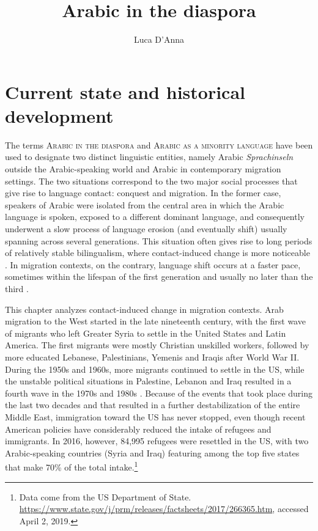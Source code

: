 \documentclass[output=paper]{langsci/langscibook}
\author{Luca D'Anna\affiliation{Università degli Studi di Napoli `L'Orientale'}}
\title{Arabic in the diaspora}
\begin{document}
\maketitle 

\section{Current state and historical development}

The terms \textsc{Arabic in the diaspora} and \textsc{Arabic as a minority language} have been used to designate two distinct linguistic entities, namely Arabic \textit{Sprachinseln} outside the Arabic-speaking world and Arabic in contemporary migration settings. The two situations correspond to the two major social processes that give rise to language contact: conquest and migration. In the former case, speakers of Arabic were isolated from the central area in which the Arabic language is spoken, exposed to a different dominant language, and consequently underwent a slow process of language erosion (and eventually shift) usually spanning across several generations. This situation often gives rise to long periods of relatively stable bilingualism, where contact-induced change is more noticeable \citep[641]{Sankoff2001}. In migration contexts, on the contrary, language shift occurs at a faster pace, sometimes within the lifespan of the first generation and usually no later than the third \citep[151]{Canagarajah2008}. 

This chapter analyzes contact-induced change in migration contexts. Arab migration to the West started in the late nineteenth century, with the first wave of migrants who left Greater Syria to settle in the United States and Latin America. The first migrants were mostly Christian unskilled workers, followed by more educated Lebanese, Palestinians, Yemenis and Iraqis after World War II. During the 1950s and 1960s, more migrants continued to settle in the US, while the unstable political situations in Palestine, Lebanon and Iraq resulted in a fourth wave in the 1970s and 1980s \citep[17--18]{Rouchdy_introduction_1992}. Because of the events that took place during the last two decades and that resulted in a further destabilization of the entire Middle East, immigration toward the US has never stopped, even though recent American policies have considerably reduced the intake of refugees and immigrants. In 2016, however, 84,995 refugees were resettled in the US, with two Arabic-speaking countries (Syria and Iraq) featuring among the top five states that make 70\% of the total intake.\footnote{Data come from the US Department of State. \url{https://www.state.gov/j/prm/releases/factsheets/2017/266365.htm}, accessed April 2, 2019.}
\end{document}
